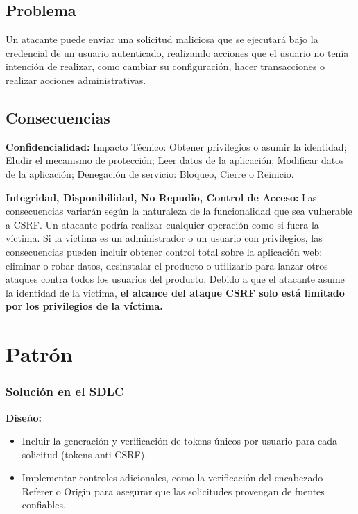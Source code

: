 \subsection*{Problema} Un atacante puede enviar una solicitud maliciosa que se ejecutará bajo la credencial de un usuario autenticado, realizando acciones que el usuario no tenía intención de realizar, como cambiar su configuración, hacer transacciones o realizar acciones administrativas.

\subsection*{Consecuencias} 

\textbf{Confidencialidad:} Impacto Técnico: Obtener privilegios o asumir la identidad; Eludir el mecanismo de protección; Leer datos de la aplicación; Modificar datos de la aplicación; Denegación de servicio: Bloqueo, Cierre o Reinicio. 

\textbf{Integridad, Disponibilidad, No Repudio, Control de Acceso: }Las consecuencias variarán según la naturaleza de la funcionalidad que sea vulnerable a CSRF. Un atacante podría realizar cualquier operación como si fuera la víctima. Si la víctima es un administrador o un usuario con privilegios, las consecuencias pueden incluir obtener control total sobre la aplicación web: eliminar o robar datos, desinstalar el producto o utilizarlo para lanzar otros ataques contra todos los usuarios del producto. Debido a que el atacante asume la identidad de la víctima, \textbf{el alcance del ataque CSRF solo está limitado por los privilegios de la víctima. }

\section{Patrón}

\subsubsection{Solución en el SDLC} \textbf{Diseño:} \begin{itemize} \item Incluir la generación y verificación de tokens únicos por usuario para cada solicitud (tokens anti-CSRF). \item Implementar controles adicionales, como la verificación del encabezado Referer o Origin para asegurar que las solicitudes provengan de fuentes confiables. \end{itemize}


